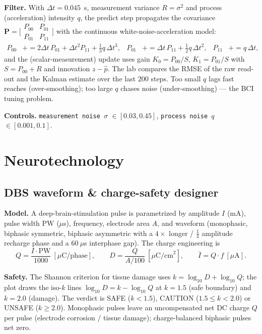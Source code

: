 \documentclass[11pt]{article}
\newcommand{\param}[1]{\textcolor{neonmag}{\texttt{#1}}}
\begin{document}
\textbf{Filter.} With $\Delta t = 0.045$~s, measurement variance $R=\sigma^2$ and process
(acceleration) intensity $q$, the predict step propagates the covariance
$\mathbf P=\big[\begin{smallmatrix}P_{00}&P_{01}\\P_{01}&P_{11}\end{smallmatrix}\big]$ with the
continuous white-noise-acceleration model:
\begin{align*}
P_{00} &\mathrel{+}= 2\Delta t\,P_{01} + \Delta t^2 P_{11} + \tfrac13 q\,\Delta t^3, &
P_{01} &\mathrel{+}= \Delta t\,P_{11} + \tfrac12 q\,\Delta t^2, &
P_{11} &\mathrel{+}= q\,\Delta t,
\end{align*}
and the (scalar-measurement) update uses gain $K_0 = P_{00}/S$, $K_1 = P_{01}/S$ with
$S = P_{00}+R$ and innovation $z - \hat p$. The lab compares the RMSE of the raw read-out and
the Kalman estimate over the last $200$ steps. Too small $q$ lags fast reaches (over-smoothing);
too large $q$ chases noise (under-smoothing) --- the BCI tuning problem.

\textbf{Controls.} \param{measurement noise $\sigma$} $\in[0.03,0.45]$,
\param{process noise $q$} $\in[0.001,0.1]$.

\section{Neurotechnology}

\subsection{DBS waveform \& charge-safety designer}

\textbf{Model.} A deep-brain-stimulation pulse is parametrized by amplitude $I$ (mA), pulse
width $\text{PW}$ ($\mu$s), frequency, electrode area $A$, and waveform (monophasic, biphasic
symmetric, biphasic asymmetric with a $4\times$ longer / $\tfrac14$ amplitude recharge phase
and a $60~\mu$s interphase gap). The charge engineering is
\[
Q = \frac{I\cdot\text{PW}}{1000}\ [\mu\text{C/phase}],\qquad
D = \frac{Q}{A/100}\ [\mu\text{C/cm}^2],\qquad
\bar I = Q\cdot f\ [\mu\text{A}].
\]

\textbf{Safety.} The Shannon criterion for tissue damage uses
$k = \log_{10} D + \log_{10} Q$; the plot draws the iso-$k$ lines $\log_{10} D = k - \log_{10} Q$
at $k=1.5$ (safe boundary) and $k=2.0$ (damage). The verdict is SAFE ($k<1.5$),
CAUTION ($1.5\le k<2.0$) or UNSAFE ($k\ge2.0$). Monophasic pulses leave an uncompensated net DC
charge $Q$ per pulse (electrode corrosion / tissue damage); charge-balanced biphasic pulses net zero.
\end{document}
